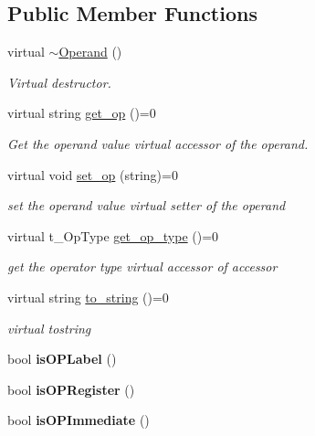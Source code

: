 \subsection*{Public Member Functions}
\begin{DoxyCompactItemize}
\item 
\mbox{\label{class_operand_aa6ef1ffa183381edb413f9b93782a67b}} 
virtual \mbox{\hyperlink{class_operand_aa6ef1ffa183381edb413f9b93782a67b}{$\sim$\+Operand}} ()
\begin{DoxyCompactList}\small\item\em Virtual destructor. \end{DoxyCompactList}\item 
\mbox{\label{class_operand_a2bf3ad8b34d39cb35ff743ffcc0f4675}} 
virtual string \mbox{\hyperlink{class_operand_a2bf3ad8b34d39cb35ff743ffcc0f4675}{get\+\_\+op}} ()=0
\begin{DoxyCompactList}\small\item\em Get the operand value virtual accessor of the operand. \end{DoxyCompactList}\item 
\mbox{\label{class_operand_a0895c39d7b97ea56f074d242e8232c78}} 
virtual void \mbox{\hyperlink{class_operand_a0895c39d7b97ea56f074d242e8232c78}{set\+\_\+op}} (string)=0
\begin{DoxyCompactList}\small\item\em set the operand value virtual setter of the operand \end{DoxyCompactList}\item 
virtual t\+\_\+\+Op\+Type \mbox{\hyperlink{class_operand_afd469e305a467e2574f34ac9bd6c62b0}{get\+\_\+op\+\_\+type}} ()=0
\begin{DoxyCompactList}\small\item\em get the operator type virtual accessor of accessor \end{DoxyCompactList}\item 
virtual string \mbox{\hyperlink{class_operand_a28aed96d5fafee66be81c30c1435ad00}{to\+\_\+string}} ()=0
\begin{DoxyCompactList}\small\item\em virtual tostring \end{DoxyCompactList}\item 
\mbox{\label{class_operand_a12ccf172b496bc2fee04f732d144641b}} 
bool {\bfseries is\+O\+P\+Label} ()
\item 
\mbox{\label{class_operand_a5c596cb4bdb24227118697d33d9833eb}} 
bool {\bfseries is\+O\+P\+Register} ()
\item 
\mbox{\label{class_operand_a91f072d08b59eaa343e512e644c8efb4}} 
bool {\bfseries is\+O\+P\+Immediate} ()
\end{DoxyCompactItemize}
